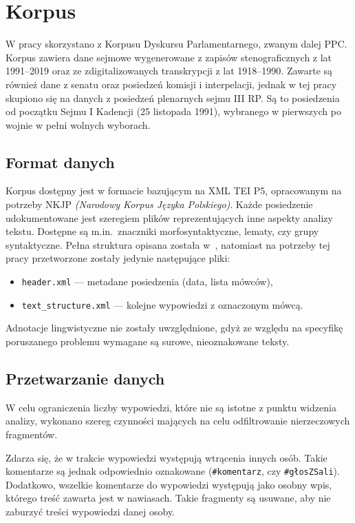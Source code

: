 
\chapter{Korpus}
  W pracy skorzystano z Korpusu Dyskursu Parlamentarnego\cite{PPC}, zwanym dalej PPC\@. 
  Korpus zawiera dane sejmowe wygenerowane z zapisów stenograficznych z lat 1991--2019
    oraz ze zdigitalizowanych transkrypcji z lat 1918--1990.
  Zawarte są również dane z senatu oraz posiedzeń komisji i interpelacji,
    jednak w tej pracy skupiono się na danych z posiedzeń plenarnych sejmu III RP\@.
  Są to posiedzenia od początku Sejmu I Kadencji (25 listopada 1991), wybranego w pierwszych po wojnie w pełni wolnych wyborach.

\section{Format danych}
  Korpus dostępny jest w formacie bazującym na XML TEI P5, opracowanym na potrzeby NKJP \textit{(Narodowy Korpus Języka Polskiego)}.
  Każde posiedzenie udokumentowane jest szeregiem plików reprezentujących inne aspekty analizy tekstu.
  Dostępne są m.in.\ znaczniki morfosyntaktyczne, lematy, czy grupy syntaktyczne.
  Pełna struktura opisana została w~\cite{PSC},
    natomiast na potrzeby tej pracy przetworzone zostały jedynie następujące pliki:
  \begin{itemize}
    \item \verb|header.xml| --- metadane posiedzenia (data, lista mówców),
    \item \verb|text_structure.xml| --- kolejne wypowiedzi z oznaczonym mówcą.
  \end{itemize}
  Adnotacje lingwistyczne nie zostały uwzględnione,
    gdyż ze względu na specyfikę poruszanego problemu wymagane są surowe, nieoznakowane teksty.
  
\section{Przetwarzanie danych}
  W celu ograniczenia liczby wypowiedzi, które nie są istotne z punktu widzenia analizy,
    wykonano szereg czynności mających na celu odfiltrowanie nierzeczowych fragmentów.
  
  Zdarza się, że w trakcie wypowiedzi występują wtrącenia innych osób.
  Takie komentarze są jednak odpowiednio oznakowane (\verb|#komentarz|, czy \verb|#głosZSali|).
  Dodatkowo, wszelkie komentarze do wypowiedzi występują jako osobny wpis, którego treść zawarta jest w nawiasach.
  Takie fragmenty są usuwane, aby nie zaburzyć treści wypowiedzi danej osoby.

